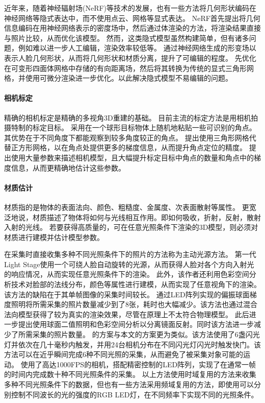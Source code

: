 近年来，随着神经辐射场(NeRF)\citep{nerf}等技术的发展，也有一些方法将几何形状编码在神经网络等隐式表达中，而不使用点云、网格等显式表达。
NeRF\citep{nerf}首先提出将几何信息编码在用神经网络表示的密度场中，然后通过体渲染的方法，将渲染结果直接与照片比较，从而优化该模型。
然而，这类隐式模型虽然构建简单，但有诸多问题，例如难以进一步人工编辑，渲染效率较低等。
\citet{MoRF}通过神经网络生成的形变场以表示人脸几何形状，从而将几何形状和材质分离，提升了可编辑的程度。
\citet{nvdiffrec,nvdiffrecmc}先优化在可变形四面体网格中存储的有向距离场，然后将其转换为传统的显式三角形网格，并使用可微分渲染进一步优化。以此解决隐式模型不易编辑的问题。

\paragraph{相机标定}
精确的相机标定是精确的多视角3D重建的基础。
目前主流的标定方法是用相机拍摄特制的标定目标。
\citet{ss_geo}采用在一个球形目标物体上随机地粘贴一些可识别的角点。
其优势在于不同角度下都能观察到较多角度较正的角点。
\citet{del_grid}提出使用三角形网格代替正方形网格，以在角点处提供更多的梯度信息，从而提升角点定位的精度。
\citet{SchopsLPS20}提出使用大量参数来描述相机模型，且大幅提升标定目标中角点的数量和角点中的梯度信息，从而更精确地估计这些参数。

\paragraph{材质估计}
材质指的是物体的表面法向、颜色、粗糙度、金属度、次表面散射等属性。
更宽泛地说，材质描述了物体将如何与光线相互作用。即如何吸收，折射，反射，散射入射的光线。
若要获得高质量的，可在任意光照条件下渲染的3D模型，则必须对材质进行建模并估计模型参数。

在采集时直接收集多种不同光照条件下的照片的方法称为主动光源方法。
第一代Light Stage\citep{light_stage}使用一个可绕人脸自动旋转的光源，从而获得人脸对各个方向入射光的响应情况，从而实现任意光照条件下的渲染。
此外，该作者还利用色彩空间分析技术\cite{temporal_color}对脸部的法线分布，颜色等属性进行建模，从而实现了任意视角下的渲染。该方法的缺陷在于其单帧图像的采集时间较长。
\citet{MaHPCWD07}通过LED阵列实现的偏振球面梯度照明将所需采集的照片数量减少到了8张，耗时也大幅减少。该方法也通过混合法向模型获得了较为真实的渲染效果，尽管在原理上不太符合物理模型。
此后\citet{KampourisZG18}进一步提出使用球面二值照明和色彩空间分析\cite{MallickZKB05}以分离镜面反射。同时该方法进一步减少了所需采集的照片数量。
\citet{FyffeGTGD16}的方案与本文的方案更为类似。该方法使用了6盏闪光灯并依次在几十毫秒内触发，并用24台相机分布在不同闪光灯闪光时触发快门。该方法可以在近乎瞬间完成6种不同光照的采集，从而避免了被采集对象可能的运动。
\citet{ZhangZZLCYXY22}使用了高达1000FPS的相机，搭配精密控制的LED阵列，实现了在通常一帧的时间内完成数十种不同光照条件的采集。
以上方法使用时域复用的方法来收集多种不同光照条件下的数据，但也有一些方法\citep{FyffeD15,MekaHPZFFKYBDDB19}采用频域复用的方法，即使用可以分别控制不同波长的光的强度的RGB LED灯，在不同频率下实现不同的光照条件。

